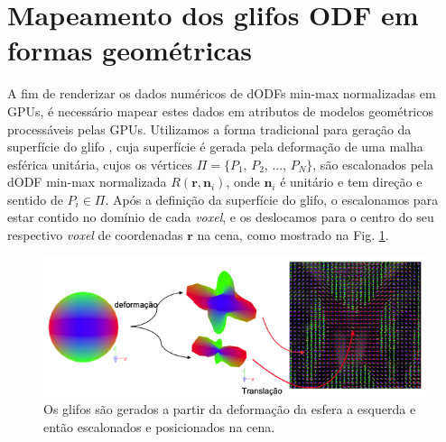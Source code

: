 \section{Mapeamento dos glifos ODF em formas geométricas}
\label{sec::renderizacao_de_glifos_ODF}


A fim de renderizar os dados numéricos de dODFs min-max normalizadas em GPUs, é necessário mapear estes dados em atributos de modelos geométricos processáveis pelas GPUs. Utilizamos a forma tradicional para geração da superfície do glifo \cite{peeters2009}, cuja superfície é gerada pela deformação de uma malha esférica unitária, cujos os vértices $\Pi = \{
P_1$,
$P_2$, ...,
$P_N
\}$, são escalonados pela dODF min-max normalizada $R(\mathbf{r}, \mathbf{n}_i)$, onde $\mathbf{n}_i$ é unitário e tem direção e sentido de $P_i \in \Pi$. Após a definição da superfície do glifo, o escalonamos para estar contido no domínio de cada \textit{voxel}, e os deslocamos para o centro do seu respectivo \textit{voxel} de coordenadas $\mathbf{r}$ na cena, como mostrado na Fig. \ref{fig::esfera_deformada_cena}.

\begin{figure}[htb]
    \centering
    \includegraphics[width=1.0\linewidth, angle=0]{figs/Esquema_Glifo/Renderizacao_multimodal.png}
    \caption{
    Os glifos são gerados a partir da deformação da esfera a esquerda e então escalonados e posicionados na cena.
    }
    \label{fig::esfera_deformada_cena}
\end{figure}

